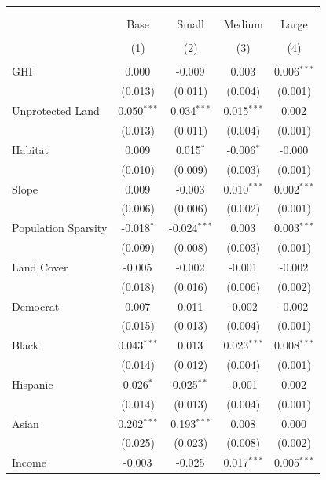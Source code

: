 \begin{table}[!htbp] \centering
\begin{tabular}{@{\extracolsep{5pt}}lcccc}
\\[-1.8ex]\hline
\hline \\[-1.8ex]
\\[-1.8ex] & \multicolumn{1}{c}{Base} & \multicolumn{1}{c}{Small} & \multicolumn{1}{c}{Medium} & \multicolumn{1}{c}{Large}  \\
\\[-1.8ex] & (1) & (2) & (3) & (4) \\
\hline \\[-1.8ex]
 GHI & 0.000$^{}$ & -0.009$^{}$ & 0.003$^{}$ & 0.006$^{***}$ \\
& (0.013) & (0.011) & (0.004) & (0.001) \\
 Unprotected Land & 0.050$^{***}$ & 0.034$^{***}$ & 0.015$^{***}$ & 0.002$^{}$ \\
& (0.013) & (0.011) & (0.004) & (0.001) \\
 Habitat & 0.009$^{}$ & 0.015$^{*}$ & -0.006$^{*}$ & -0.000$^{}$ \\
& (0.010) & (0.009) & (0.003) & (0.001) \\
 Slope & 0.009$^{}$ & -0.003$^{}$ & 0.010$^{***}$ & 0.002$^{***}$ \\
& (0.006) & (0.006) & (0.002) & (0.001) \\
 Population Sparsity & -0.018$^{*}$ & -0.024$^{***}$ & 0.003$^{}$ & 0.003$^{***}$ \\
& (0.009) & (0.008) & (0.003) & (0.001) \\
 Land Cover & -0.005$^{}$ & -0.002$^{}$ & -0.001$^{}$ & -0.002$^{}$ \\
& (0.018) & (0.016) & (0.006) & (0.002) \\
 Democrat & 0.007$^{}$ & 0.011$^{}$ & -0.002$^{}$ & -0.002$^{}$ \\
& (0.015) & (0.013) & (0.004) & (0.001) \\
 Black & 0.043$^{***}$ & 0.013$^{}$ & 0.023$^{***}$ & 0.008$^{***}$ \\
& (0.014) & (0.012) & (0.004) & (0.001) \\
 Hispanic & 0.026$^{*}$ & 0.025$^{**}$ & -0.001$^{}$ & 0.002$^{}$ \\
& (0.014) & (0.013) & (0.004) & (0.001) \\
 Asian & 0.202$^{***}$ & 0.193$^{***}$ & 0.008$^{}$ & 0.000$^{}$ \\
& (0.025) & (0.023) & (0.008) & (0.002) \\
 Income & -0.003$^{}$ & -0.025$^{}$ & 0.017$^{***}$ & 0.005$^{***}$ \\

\end{tabular}
\end{table}
